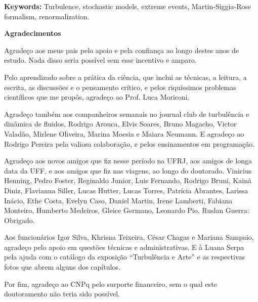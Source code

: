 \documentclass[brazil,12pt,a4paper,openany]{book}
\begin{document}
\vspace{15pt}

\textbf{Keywords:} Turbulence, stochastic models, extreme events, Martin-Siggia-Rose formalism, renormalization.


\newpage

\noindent

\vspace*{20pt}

\begin{center}

{\LARGE\bf Agradecimentos}

\end{center}

\vspace*{40pt}

Agradeço aos meus pais pelo apoio e pela confiança ao longo destes anos de estudo. Nada disso seria possível sem esse incentivo e amparo.

Pelo aprendizado sobre a prática da ciência, que inclui as técnicas, a leitura, a escrita, as discussões e o pensamento crítico, e pelos riquíssimos problemas científicos que me propôs, agradeço ao Prof. Luca Moriconi.

Agradeço também aos companheiros semanais no journal club de turbulência e dinâmica de fluidos, Rodrigo Arouca, Elvis Soares, Bruno Magacho, Victor Valadão, Mirlene Oliveira, Marina Moesia e Maiara Neumann. E agradeço ao Rodrigo Pereira pela valiosa colaboração, e pelos ensinamentos em programação.

Agradeço aos novos amigos que fiz nesse período na UFRJ, aos amigos de longa data da UFF, e aos amigos que fiz nas viagens, ao longo do doutorado. Vinicius Henning, Pedro Foster, Reginaldo Junior, Luis Fernando, Rodrigo Bruni, Kainã Diniz, Flavianna Siller, Lucas Hutter, Lucas Torres,  Patrícia Abrantes, Larissa Inácio, Ethe Costa, Evelyn Caso, Daniel Martin, Irene Lamberti, Fabiana Monteiro, Humberto Medeiros, Gleice Germano, Leonardo Pio, Ruslan Guerra: Obrigado.

Aos funcionários Igor Silva, Khrisna Teixeira, César Chagas e Mariana Sampaio, agradeço pelo apoio em questões técnicas e administrativas.
E à Luana Serpa pela ajuda com o catálogo da exposição \enquote{Turbulência e Arte} e as respectivas fotos que abrem alguns dos capítulos.

Por fim, agradeço ao CNPq pelo surporte financeiro, sem o qual este doutoramento não teria sido possível.
\end{document}
